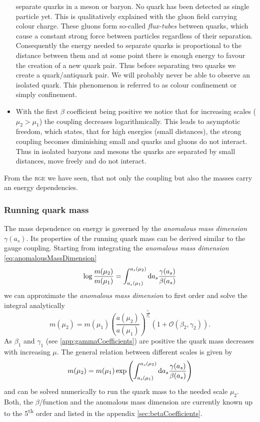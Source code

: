 \documentclass[../../index.tex]{subfiles}
\begin{document}
\begin{itemize}
  separate quarks in a meson or baryon. No quark has been detected as single
  particle yet. This is qualitatively explained with the gluon field carrying
  colour charge. These gluons form so-called \textit{flux-tubes} between quarks,
  which cause a constant strong force between particles regardless of their
  separation. Consequently the energy needed to separate quarks is proportional
  to the distance between them and at some point there is enough energy to
  favour the creation of a new quark pair. Thus before separating two quarks we
  create a quark\-/antiquark pair. We will probably never be able to observe an
  isolated quark. This phenomenon is referred to as colour confinement or simply
  confinement.
\item With the first \(\beta\) coefficient being positive we notice that for
  increasing scales (\(\mu_2>\mu_1\)) the coupling decreases logarithmically.
  This leads to asymptotic freedom, which states, that for high energies (small
  distances), the strong coupling becomes diminishing small and quarks and
  gluons do not interact. Thus in isolated baryons and mesons the quarks are
  separated by small distances, move freely and do not interact. \end{itemize}

From the \textsc{rge} we have seen, that not only the coupling but also the
masses carry an energy dependencies.

\subsubsection{Running quark mass}
The mass dependence on energy is governed by the \textit{anomalous mass
  dimension} \(\gamma(a_s)\). Its properties of the running quark mass can be
derived similar to the gauge coupling. Starting from integrating the
\textit{anomalous mass dimension} \cref{eq:anomalousMassDimension}
\begin{equation}
  \log \frac{m(\mu_2)}{m(\mu_1)} = \int_{a_s(\mu_1)}^{a_s(\mu_2)} \dif a_s \frac{\gamma(a_s)}{\beta(a_s)}
\end{equation}
we can approximate the \textit{anomalous mass dimension} to first order and
solve the integral analytically \cite{Schwab2002}
\begin{equation}
  m(\mu_2) = m(\mu_1)\left( \frac{a(\mu_2)}{a(\mu_1)} \right)^{\frac{\gamma_1}{\beta_1}} \left( 1 + \mathcal{O}(\beta_2, \gamma_2) \right).
\end{equation}
As \(\beta_1\) and \(\gamma_1\) (see \ref{app:gammaCoefficients}) are positive
the quark mass decreases with increasing \(\mu\). The general relation between
different scales is given by
\begin{equation}
  m(\mu_2) = m(\mu_1) \exp \left( \int_{a_s(\mu_1)}^{a_s(\mu_2)} \dif a_s \frac{\gamma(a_s)}{\beta(a_s)}  \right)
\end{equation}
and can be solved numerically to run the quark mass to the needed scale
\(\mu_2\). Both, the \(\beta\)\-/function and the anomalous mass dimension are
currently known up to the 5\textsuperscript{th} order and listed in the appendix
\ref{sec:betaCoefficients}.
\end{document}
